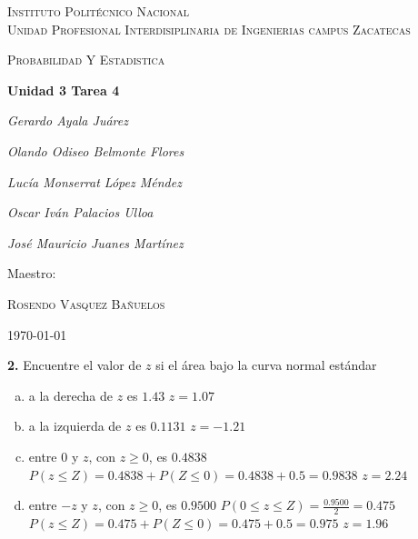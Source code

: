 \documentclass[12pt, letterpaper]{article}
\begin{document}
    \begin{titlepage}
        \centering
        {\scshape\LARGE Instituto Politécnico Nacional\\ Unidad Profesional Interdisiplinaria de Ingenierias campus Zacatecas\par}
        \vspace{1cm}
        {\scshape\Large Probabilidad Y Estadistica\par}
        \vspace{1.5cm}
        {\huge\bfseries Unidad 3 Tarea 4\par}
        \vspace{2cm}
        {\Large\itshape Gerardo Ayala Juárez\par}
        {\Large\itshape Olando Odiseo Belmonte Flores\par}
        {\Large\itshape Lucía Monserrat López Méndez\par}
        {\Large\itshape Oscar Iván Palacios Ulloa\par}
        {\Large\itshape José Mauricio Juanes Martínez\par}
        \vfill
        Maestro:\par
        \textsc{
        Rosendo Vasquez Bañuelos}
        \vfill
        {\large \today \par}
    \end{titlepage}

    \textbf{2. }Encuentre el valor de $z$ si el área bajo la curva normal estándar
    \begin{enumerate}[a)]
        \item a la derecha de $z$ es $1.43$\vskip0.5cm
        $z=1.07$
        \item a la izquierda de $z$ es $0.1131$\vskip0.5cm
        $z=-1.21$
        \item entre $0$ y $z$, con $z\geq 0$, es $0.4838$\vskip0.5cm
        $P(z\leq Z)=0.4838+P(Z\leq 0)=0.4838+0.5=0.9838$\vskip0.5cm
        $z=2.24$
        \item entre $-z$ y $z$, con $z\geq 0$, es $0.9500$\vskip0.5cm
        $P(0\leq z\leq Z)=\displaystyle\frac{0.9500}{2}=0.475$\vskip0.5cm
        $P(z\leq Z)=0.475+P(Z\leq 0)=0.475+0.5=0.975$\vskip0.5cm
        $z=1.96$
    \end{enumerate} \vskip1cm
\end{document}
